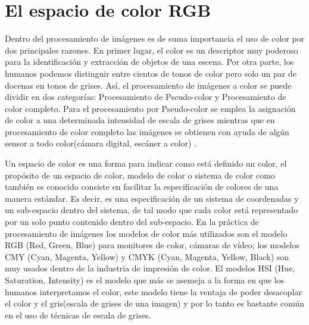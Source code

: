 \section{El espacio de color RGB} \label{sec:el_espacio_de_color_RGB}

Dentro del procesamiento de imágenes es de suma importancia el uso de color por dos principales razones. En primer lugar, el color es un descriptor muy poderoso para la identificación y extracción de objetos de una escena. Por otra parte, los humanos podemos distinguir entre cientos de tonos de color pero solo un par de docenas en tonos de grises. Así, el procesamiento de imágenes a color se puede dividir en dos categorías: Procesamiento de Pseudo-color y Procesamiento de color completo. Para el procesamiento por Pseudo-color se emplea la asignación de color a una determinada intensidad de escala de grises mientras que en procesamiento de  color completo las imágenes se obtienen con ayuda de algún sensor a todo color(cámara digital, escáner a color) \cite{gonzalez2009digital}.

Un espacio de color es una forma para indicar como está definido un color, el propósito de un espacio de color, modelo de color o sistema de color como también es conocido consiste en facilitar la especificación de colores de una manera estándar. Es decir, es una especificación de un sistema de coordenadas y un sub-espacio dentro del sistema, de tal modo que cada color está representado por un solo punto contenido dentro del sub-espacio. En la práctica de procesamiento de imágenes los modelos de color más utilizados son el modelo RGB (Red, Green, Blue) para monitores de color, cámaras de vídeo; los modelos CMY (Cyan, Magenta, Yellow) y CMYK (Cyan, Magenta, Yellow, Black) son muy usados dentro de la industria de impresión de color. El modelos HSI (Hue, Saturation, Intensity) es el modelo que más se asemeja a la forma en que los humanos interpretamos el color, este modelo tiene la ventaja de poder desacoplar el color y el gris(escala de grises de una imagen) y por lo tanto es bastante común en el uso de técnicas de escala de grises\cite{gonzalez2009digital}.

